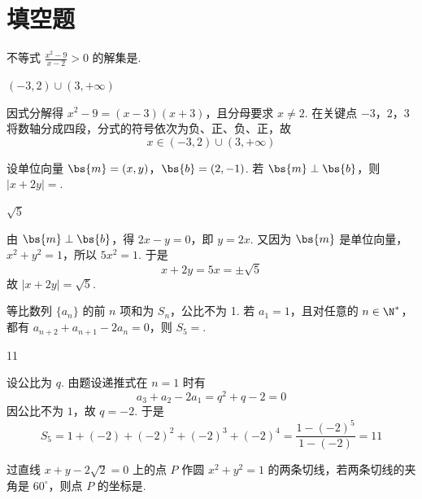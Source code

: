 \section{填空题}

\begin{problem}
不等式 \(\frac{x^2 - 9}{x - 2} > 0\) 的解集是\fillinblank{}.
\end{problem}

\begin{answer}
\((-3,2)\cup(3,+\infty)\)
\end{answer}

\begin{solution}
因式分解得 \(x^2-9=(x-3)(x+3)\)，且分母要求 \(x\neq2\). 在关键点
\(-3\)，\(2\)，\(3\) 将数轴分成四段，分式的符号依次为负、正、负、正，故
\[
x\in(-3,2)\cup(3,+\infty)
\]
\end{solution}

\begin{problem}
设单位向量 \(\bs{m} = (x, y)\)，\(\bs{b} = (2, -1)\). 若 \(\bs{m} \perp \bs{b}\)，则 \(|x + 2y| = \)\fillinblank{}.
\end{problem}

\begin{answer}
\(\sqrt{5}\)
\end{answer}

\begin{solution}
由 \(\bs{m}\perp\bs{b}\)，得
\(2x-y=0\)，即 \(y=2x\). 又因为 \(\bs{m}\) 是单位向量，
\(x^2+y^2=1\)，所以 \(5x^2=1\). 于是
\[
x+2y=5x=\pm\sqrt{5}
\]
故 \(\lvert x+2y\rvert=\sqrt{5}\).
\end{solution}

\begin{problem}
等比数列 \(\{a_{n}\}\) 的前 \(n\) 项和为 \(S_{n}\)，公比不为 1. 若 \(a_{1} = 1\)，且对任意的 \(n \in \N^{*}\)，都有 \(a_{n+2} + a_{n+1} - 2a_{n} = 0\)，则 \(S_{5} = \)\fillinblank{}.
\end{problem}

\begin{answer}
11
\end{answer}

\begin{solution}
设公比为 \(q\). 由题设递推式在 \(n=1\) 时有
\[
a_3+a_2-2a_1=q^2+q-2=0
\]
因公比不为 \(1\)，故 \(q=-2\). 于是
\[
S_5=1+(-2)+(-2)^2+(-2)^3+(-2)^4
 =\frac{1-(-2)^5}{1-(-2)}=11
\]
\end{solution}

\begin{problem}
过直线 \(x + y - 2\sqrt{2} = 0\) 上的点 \(P\) 作圆 \(x^{2} + y^{2} = 1\) 的两条切线，若两条切线的夹角是 \(60^{\circ}\)，则点 \(P\) 的坐标是\fillinblank{}.
\end{problem}

